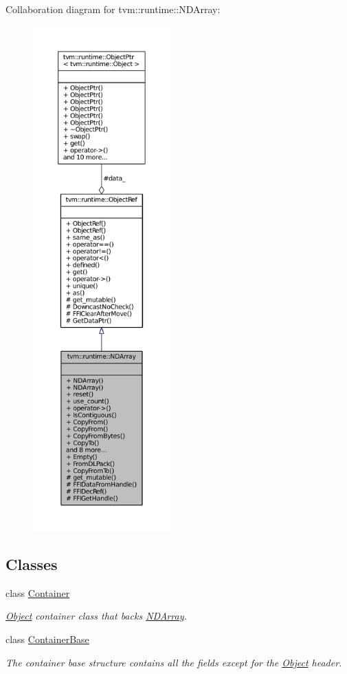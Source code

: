 Collaboration diagram for tvm\+:\+:runtime\+:\+:N\+D\+Array\+:
\nopagebreak
\begin{figure}[H]
\begin{center}
\leavevmode
\includegraphics[height=550pt]{classtvm_1_1runtime_1_1NDArray__coll__graph}
\end{center}
\end{figure}
\subsection*{Classes}
\begin{DoxyCompactItemize}
\item 
class \hyperlink{classtvm_1_1runtime_1_1NDArray_1_1Container}{Container}
\begin{DoxyCompactList}\small\item\em \hyperlink{classtvm_1_1runtime_1_1Object}{Object} container class that backs \hyperlink{classtvm_1_1runtime_1_1NDArray}{N\+D\+Array}. \end{DoxyCompactList}\item 
class \hyperlink{classtvm_1_1runtime_1_1NDArray_1_1ContainerBase}{Container\+Base}
\begin{DoxyCompactList}\small\item\em The container base structure contains all the fields except for the \hyperlink{classtvm_1_1runtime_1_1Object}{Object} header. \end{DoxyCompactList}\end{DoxyCompactItemize}
